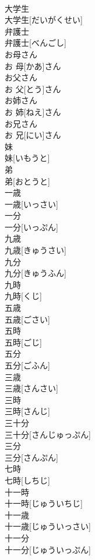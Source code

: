 \documentclass[8pt]{extreport}
\begin{document}
\begin{CJK}{UTF8}{min}
\\	大学生	
\\	大学生[だいがくせい]
\\	弁護士	
\\	弁護士[べんごし]
\\	お母さん	
\\	お 母[かあ]さん
\\	お父さん	
\\	お 父[とう]さん
\\	お姉さん	
\\	お 姉[ねえ]さん
\\	お兄さん	
\\	お 兄[にい]さん
\\	妹	
\\	妹[いもうと]
\\	弟	
\\	弟[おとうと]
\\	一歳	
\\	一歳[いっさい]
\\	一分	
\\	一分[いっぷん]
\\	九歳	
\\	九歳[きゅうさい]
\\	九分	
\\	九分[きゅうふん]
\\	九時	
\\	九時[くじ]
\\	五歳	
\\	五歳[ごさい]
\\	五時	
\\	五時[ごじ]
\\	五分	
\\	五分[ごふん]
\\	三歳	
\\	三歳[さんさい]
\\	三時	
\\	三時[さんじ]
\\	三十分	
\\	三十分[さんじゅっぷん]
\\	三分	
\\	三分[さんぷん]
\\	七時	
\\	七時[しちじ]
\\	十一時	
\\	十一時[じゅういちじ]
\\	十一歳	
\\	十一歳[じゅういっさい]
\\	十一分	
\\	十一分[じゅういっぷん]

\end{CJK}
\end{document}
